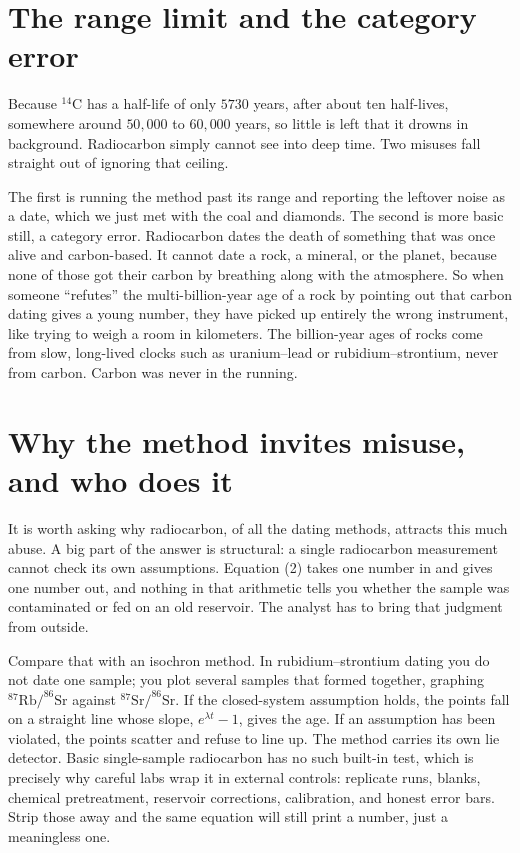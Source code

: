 \documentclass[11pt]{article}
\begin{document}
\section*{The range limit and the category error}

Because $^{14}\mathrm{C}$ has a half-life of only $5730$ years, after about ten half-lives, somewhere around $50{,}000$ to $60{,}000$ years, so little is left that it drowns in background. Radiocarbon simply cannot see into deep time. Two misuses fall straight out of ignoring that ceiling.

The first is running the method past its range and reporting the leftover noise as a date, which we just met with the coal and diamonds. The second is more basic still, a category error. Radiocarbon dates the death of something that was once alive and carbon-based. It cannot date a rock, a mineral, or the planet, because none of those got their carbon by breathing along with the atmosphere. So when someone ``refutes'' the multi-billion-year age of a rock by pointing out that carbon dating gives a young number, they have picked up entirely the wrong instrument, like trying to weigh a room in kilometers. The billion-year ages of rocks come from slow, long-lived clocks such as uranium--lead or rubidium--strontium, never from carbon. Carbon was never in the running.

\section*{Why the method invites misuse, and who does it}

It is worth asking why radiocarbon, of all the dating methods, attracts this much abuse. A big part of the answer is structural: a single radiocarbon measurement cannot check its own assumptions. Equation (2) takes one number in and gives one number out, and nothing in that arithmetic tells you whether the sample was contaminated or fed on an old reservoir. The analyst has to bring that judgment from outside.

Compare that with an isochron method. In rubidium--strontium dating you do not date one sample; you plot several samples that formed together, graphing $^{87}\mathrm{Rb}/^{86}\mathrm{Sr}$ against $^{87}\mathrm{Sr}/^{86}\mathrm{Sr}$. If the closed-system assumption holds, the points fall on a straight line whose slope, $e^{\lambda t}-1$, gives the age. If an assumption has been violated, the points scatter and refuse to line up. The method carries its own lie detector. Basic single-sample radiocarbon has no such built-in test, which is precisely why careful labs wrap it in external controls: replicate runs, blanks, chemical pretreatment, reservoir corrections, calibration, and honest error bars. Strip those away and the same equation will still print a number, just a meaningless one.
\end{document}
